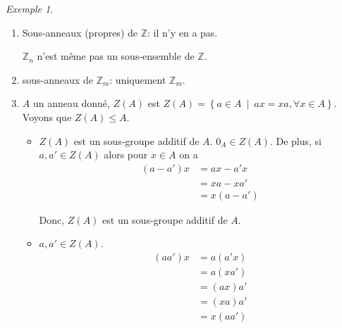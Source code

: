 \documentclass{report}
\theoremstyle{definition}
\theoremstyle{remark}
\newtheorem*{exem}{Exemple}
\def\lte{\leqslant}
\def\ZZ{\mathbb{Z}}
\begin{document}
	\begin{exem}
		\begin{enumerate}
			\item Sous-anneaux (propres) de $\ZZ$: il n'y en a pas.

			$\ZZ_n$ n'est m\^eme pas un sous-ensemble de $\ZZ$.
			\item sous-anneaux de $\ZZ_m$: uniquement $\ZZ_m$.
			\item $A$ un anneau donn\'e, $Z(A)$ est $Z(A) = \left\{ a \in A ~\middle|~ ax=xa, \forall x \in A \right\}$. Voyons que $Z(A) \lte A$.
			\begin{itemize}
				\item $Z(A)$ est un sous-groupe additif de $A$. $0_A \in Z(A)$. De plus, si $a,a' \in Z(A)$ alors pour $x \in A$ on a
				\begin{align*}
					(a-a')x&= ax-a'x\\
					&= xa-xa'\\
					&= x(a-a')
				\end{align*}

				Donc, $Z(A)$ est un sous-groupe additif de $A$.
				\item $a,a' \in Z(A)$.
				\begin{align*}
					(aa')x&= a(a'x)\\
					&= a(xa')\\
					&= (ax)a'\\
					&= (xa)a'\\
					&= x(aa')
				\end{align*}


\end{itemize}
\end{enumerate}
\end{exem}
\end{document}
